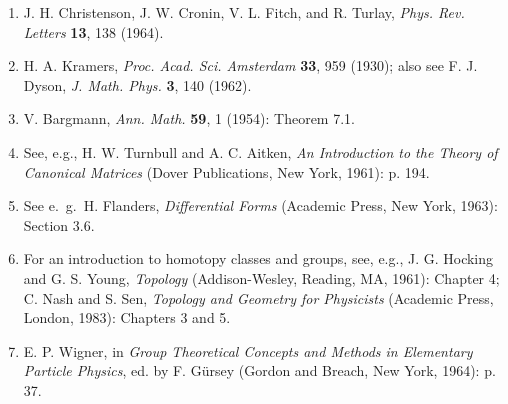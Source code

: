 \begin{enumerate}
\item[9.]\label{ref:2.9} J. H. Christenson, J. W. Cronin, V. L. Fitch, and R. Turlay,
  \emph{Phys. Rev. Letters} \textbf{13}, 138 (1964).

\item[10.]\label{ref:2.10} H. A. Kramers, \emph{Proc. Acad. Sci. Amsterdam} \textbf{33}, 959
  (1930); also see F. J. Dyson, \emph{J. Math. Phys.} \textbf{3}, 140 (1962).

\item[11.]\label{ref:2.11} V. Bargmann, \emph{Ann. Math.} \textbf{59}, 1 (1954): Theorem 7.1.

\item[12.]\label{ref:2.12} See, e.g., H. W. Turnbull and A. C. Aitken, \emph{An Introduction
  to the Theory of Canonical Matrices} (Dover Publications, New York, 1961):
  p. 194.

\item[13.]\label{ref:2.13} See e.\ g.\ H. Flanders, \emph{Differential Forms} (Academic Press,
  New York, 1963): Section 3.6.

\item[14.]\label{ref:2.14} For an introduction to homotopy classes and groups, see, e.g.,
  J. G. Hocking and G. S. Young, \emph{Topology} (Addison-Wesley, Reading,
  MA, 1961): Chapter 4; C. Nash and S. Sen, \emph{Topology and Geometry for
  Physicists} (Academic Press, London, 1983): Chapters 3 and 5.

\item[15.]\label{ref:2.15} E. P. Wigner, in \emph{Group Theoretical Concepts and Methods in
  Elementary Particle Physics}, ed. by F. G\"ursey (Gordon and Breach, New
  York, 1964): p. 37.
\end{enumerate}
